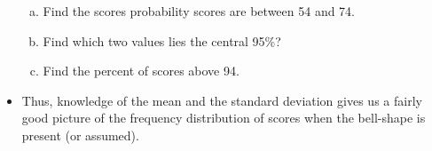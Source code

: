 \documentclass{article}
\begin{document}
\begin{itemize}
\begin{enumerate}[(a)]
        \item Find the scores probability scores are between 54 and 74.\vspace{30pt}
        \item Find which two values lies the central 95\%?\vspace{30pt}
        \item Find the percent of scores above 94.\vspace{30pt}
    \end{enumerate}
    \item Thus, knowledge of the mean and the standard deviation gives us a fairly good picture of the frequency distribution of scores when the bell-shape is present (or assumed). 
\end{itemize}\bigskip
\end{document}

